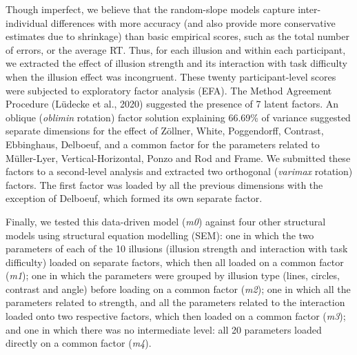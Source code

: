 \documentclass[
  man,floatsintext]{apa6}
\begin{document}
Though imperfect, we believe that the random-slope models capture inter-individual differences with more accuracy (and also provide more conservative estimates due to shrinkage) than basic empirical scores, such as the total number of errors, or the average RT. Thus, for each illusion and within each participant, we extracted the effect of illusion strength and its interaction with task difficulty when the illusion effect was incongruent. These twenty participant-level scores were subjected to exploratory factor analysis (EFA). The Method Agreement Procedure (Lüdecke et al., 2020) suggested the presence of 7 latent factors. An oblique (\emph{oblimin} rotation) factor solution explaining 66.69\% of variance suggested separate dimensions for the effect of Zöllner, White, Poggendorff, Contrast, Ebbinghaus, Delboeuf, and a common factor for the parameters related to Müller-Lyer, Vertical-Horizontal, Ponzo and Rod and Frame. We submitted these factors to a second-level analysis and extracted two orthogonal (\emph{varimax} rotation) factors. The first factor was loaded by all the previous dimensions with the exception of Delboeuf, which formed its own separate factor.

Finally, we tested this data-driven model (\emph{m0}) against four other structural models using structural equation modelling (SEM): one in which the two parameters of each of the 10 illusions (illusion strength and interaction with task difficulty) loaded on separate factors, which then all loaded on a common factor (\emph{m1}); one in which the parameters were grouped by illusion type (lines, circles, contrast and angle) before loading on a common factor (\emph{m2}); one in which all the parameters related to strength, and all the parameters related to the interaction loaded onto two respective factors, which then loaded on a common factor (\emph{m3}); and one in which there was no intermediate level: all 20 parameters loaded directly on a common factor (\emph{m4}).
\end{document}
